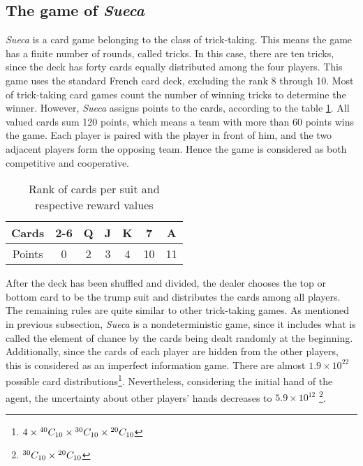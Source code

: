 \subsection{The game of \emph{Sueca}}

\emph{Sueca} is a card game belonging to the class of trick-taking.
This means the game has a finite number of rounds, called tricks.
In this case, there are ten tricks, since the deck has forty cards equally distributed among the four players.
This game uses the standard French card deck, excluding the rank 8 through 10.
Most of trick-taking card games count the number of winning tricks to determine the winner.
However, \emph{Sueca} assigns points to the cards, according to the table \ref{points-table}.
All valued cards sum 120 points, which means a team with more than 60 points wins the game.
Each player is paired with the player in front of him, and the two adjacent players form the opposing team.
Hence the game is considered as both competitive and cooperative.

\begin{table}[ht]
\centering
\begin{tabular}{|c|c|c|c|c|c|c|}
\hline
Cards  & 2-6 & Q & J & K & 7  & A  \\ \hline
Points & 0   & 2 & 3 & 4 & 10 & 11 \\ \hline
\end{tabular}
\caption{Rank of cards per suit and respective reward values}
\label{points-table}
\end{table}

After the deck has been shuffled and divided, the dealer chooses the top or bottom card to be the trump suit and distributes the cards among all players.
The remaining rules are quite similar to other trick-taking games.
As mentioned in previous subsection, \emph{Sueca} is a nondeterministic game, since it includes what is called the element of chance by the cards being dealt randomly at the beginning.
Additionally, since the cards of each player are hidden from the other players, this is considered as an imperfect information game.
There are almost $1.9\times10^{22}$ possible card distributions\footnote{$4\times{}^{40}C_{10}\times{}^{30}C_{10}\times{}^{20}C_{10}$}.
Nevertheless, considering the initial hand of the agent, the uncertainty about other players' hands decreases to $5.9\times10^{12}$ \footnote{${}^{30}C_{10}\times{}^{20}C_{10}$}.